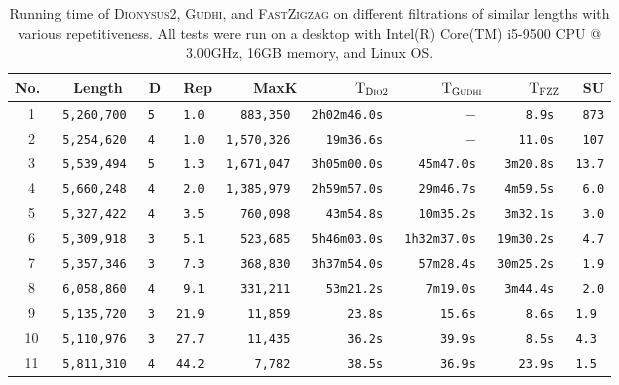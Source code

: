 \documentclass[letterpaper,11pt]{article}
\theoremstyle{mythmstyle}
\theoremstyle{mydefstyle}
\theoremstyle{plain}
\theoremstyle{definition}
\newcommand{\<}[1]{\langle #1\rangle}
\newcommand{\Gudhi}{\textsc{Gudhi}}
\newcommand{\Dionysustwo}{\textsc{Dionysus2}}
\begin{document}
\newcommand{\tabnum}[1]{\tt\small #1}
\begin{table}[!htb]
\centering
\caption{Running time of \Dionysustwo{}, \Gudhi{}, and \textsc{FastZigzag}
on different filtrations of similar lengths with various repetitiveness.
All tests were run on a desktop with Intel(R) Core(TM) i5-9500 CPU @ 3.00GHz, 16GB memory, and Linux OS.}
\label{tab:perform}
\begin{tabular}{cccrrrrrr}
\midrule
No.\  & {Length} & D & Rep & MaxK & {$\text{T}_\textsc{Dio2}$} & {$\text{T}_\textsc{Gudhi}$} & {$\text{T}_\textsc{FZZ}$} & SU\\
\midrule
1 & \tabnum{5,260,700} & \tabnum{5} & \tabnum{1.0} & 
  \tabnum{883,350} & 
  \tabnum{2h02m46.0s} & 
  \tabnum{$-$} & 
  \tabnum{8.9s} &
  \tabnum{873}
\\
2 & \tabnum{5,254,620} & \tabnum{4} & \tabnum{1.0} & 
  \tabnum{1,570,326} & 
  \tabnum{19m36.6s} & 
  \tabnum{$-$} & 
  \tabnum{11.0s} &
  \tabnum{107}
\\
3 & \tabnum{5,539,494} & \tabnum{5} & \tabnum{1.3} & 
  \tabnum{1,671,047} & 
  \tabnum{3h05m00.0s} & 
  \tabnum{45m47.0s} & 
  \tabnum{3m20.8s} &
  \tabnum{13.7}
\\
4 & \tabnum{5,660,248} & \tabnum{4} & \tabnum{2.0} & 
  \tabnum{1,385,979} & 
  \tabnum{2h59m57.0s} & 
  \tabnum{29m46.7s} & 
  \tabnum{4m59.5s} &
  \tabnum{6.0}
\\
5 & \tabnum{5,327,422} & \tabnum{4} & \tabnum{3.5} & 
  \tabnum{760,098} & 
  \tabnum{43m54.8s} & 
  \tabnum{10m35.2s} & 
  \tabnum{3m32.1s} &
  \tabnum{3.0}
\\
6 & \tabnum{5,309,918} & \tabnum{3} & \tabnum{5.1} & 
  \tabnum{523,685} & 
  \tabnum{5h46m03.0s} & 
  \tabnum{1h32m37.0s} & 
  \tabnum{19m30.2s} &
  \tabnum{4.7}
\\
7 & \tabnum{5,357,346} & \tabnum{3} & \tabnum{7.3} & 
  \tabnum{368,830} & 
  \tabnum{3h37m54.0s} & 
  \tabnum{57m28.4s} & 
  \tabnum{30m25.2s} &
  \tabnum{1.9}
\\
8 & \tabnum{6,058,860} & \tabnum{4} & \tabnum{9.1} & 
  \tabnum{331,211} & 
  \tabnum{53m21.2s} & 
  \tabnum{7m19.0s} & 
  \tabnum{3m44.4s} &
  \tabnum{2.0}
\\
9 & \tabnum{5,135,720} & \tabnum{3} & \tabnum{21.9} & 
  \tabnum{11,859} & 
  \tabnum{23.8s} &
  \tabnum{15.6s} &
  \tabnum{8.6s} &
  \tabnum{1.9} 
\\
10 & \tabnum{5,110,976} & \tabnum{3} & \tabnum{27.7} & 
  \tabnum{11,435} & 
  \tabnum{36.2s} &
  \tabnum{39.9s} &
  \tabnum{8.5s} &
  \tabnum{4.3} 
\\
11 & \tabnum{5,811,310} & \tabnum{4} & \tabnum{44.2} & 
  \tabnum{7,782} & 
  \tabnum{38.5s} &
  \tabnum{36.9s} &
  \tabnum{23.9s} &
  \tabnum{1.5} 
\\
\midrule
\end{tabular}
\end{table}
\end{document}
